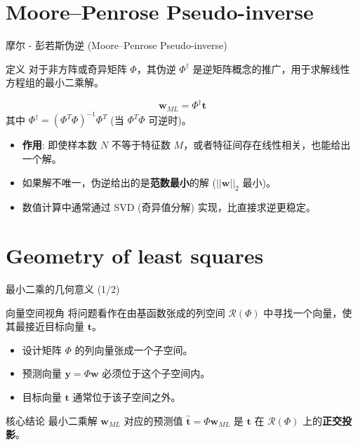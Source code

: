 \documentclass[12pt, aspectratio=169]{beamer}
\newcommand{\bw}{\mathbf{w}}
\newcommand{\by}{\mathbf{y}}
\newcommand{\bt}{\mathbf{t}}
\begin{document}
\section{Moore–Penrose Pseudo-inverse}
\begin{frame}{摩尔 - 彭若斯伪逆 (Moore–Penrose Pseudo-inverse)}
    \begin{block}{定义}
        对于非方阵或奇异矩阵 $\Phi$，其伪逆 $\Phi^\dagger$ 是逆矩阵概念的推广，用于求解线性方程组的最小二乘解。
    \end{block}
    
    \begin{equation*}
        \bw_{ML} = \Phi^\dagger \bt
    \end{equation*}
    其中 $\Phi^\dagger = (\Phi^T \Phi)^{-1} \Phi^T$ (当 $\Phi^T \Phi$ 可逆时)。
    
    \vspace{0.5cm}
    \begin{itemize}
        \item \textbf{作用}: 即使样本数 $N$ 不等于特征数 $M$，或者特征间存在线性相关，也能给出一个解。
        \item 如果解不唯一，伪逆给出的是\textbf{范数最小}的解 ($||\bw||_2$ 最小)。
        \item 数值计算中通常通过 SVD (奇异值分解) 实现，比直接求逆更稳定。
    \end{itemize}
\end{frame}

\section{Geometry of least squares}
\begin{frame}{最小二乘的几何意义 (1/2)}
    \begin{block}{向量空间视角}
        将问题看作在由基函数张成的列空间 $\mathcal{R}(\Phi)$ 中寻找一个向量，使其最接近目标向量 $\bt$。
    \end{block}
    
    \vspace{0.5cm}
    \begin{itemize}
        \item 设计矩阵 $\Phi$ 的列向量张成一个子空间。
        \item 预测向量 $\by = \Phi \bw$ 必须位于这个子空间内。
        \item 目标向量 $\bt$ 通常位于该子空间之外。
    \end{itemize}
    
    \vspace{0.5cm}
    \begin{alertblock}{核心结论}
        最小二乘解 $\bw_{ML}$ 对应的预测值 $\hat{\bt} = \Phi \bw_{ML}$ 是 $\bt$ 在 $\mathcal{R}(\Phi)$ 上的\textbf{正交投影}。
    \end{alertblock}
\end{frame}
\end{document}
